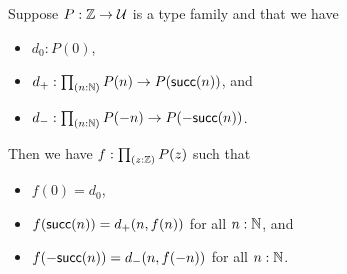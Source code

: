 \documentclass[hott-all.tex]{subfiles}
\begin{document}
% 
\begin{lem}
  Suppose $P:\mathbb{Z}\to\mathcal{U}$ is a type family and that we have
  \begin{itemize}
  \item $d_0: P(0)$,
  \item $d_+: \prd{n:\N} P(n) \to P(\suc(n))$, and
  \item $d_- : \prd{n:\N} P(-n) \to P(-\suc(n))$.
  \end{itemize}
  Then we have $f:\prd{z:\Z} P(z)$ such that
  \begin{itemize}
    \item $f(0) = d_0$,
    \item $f(\mathsf{succ}(n)) = d_+(n,f(n))$ for all $n:\mathbb{N}$, and
    \item $f(-\mathsf{succ}(n)) = d_-(n,f(-n))$ for all $n:\mathbb{N}$.
  \end{itemize}
\end{lem}
\end{document}
